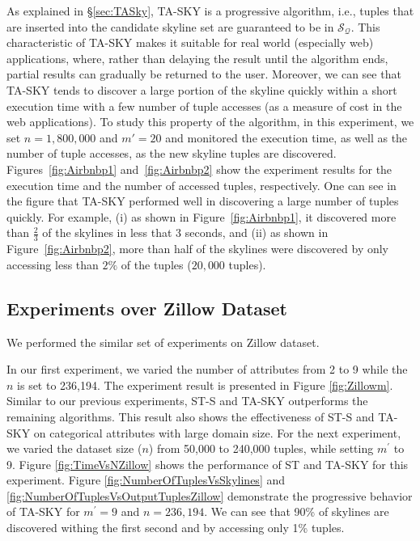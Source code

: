 \vspace{1mm}
As explained in \S\ref{sec:TASky}, TA-SKY is a progressive algorithm, i.e., tuples that are inserted into the candidate skyline set are guaranteed to be in $\mathcal{S}_\mathcal{Q}$.
This characteristic of TA-SKY makes it suitable for real world (especially web) applications, where, rather than delaying the result until the algorithm ends, partial results can gradually be returned to the user. Moreover, we can see that TA-SKY tends to discover a large portion of the skyline quickly within a short execution time with a few number of tuple accesses (as a measure of cost in the web applications).
To study this property of the algorithm, in this experiment, we set $n=1,800,000$ and $m'=20$ and monitored the execution time, as well as the number of tuple accesses, as the new skyline tuples are discovered. 
Figures~\ref{fig:Airbnbp1} and~\ref{fig:Airbnbp2} show the experiment results for the execution time and the number of accessed tuples, respectively.
One can see in the figure that TA-SKY performed well in discovering a large number of tuples quickly. For example, (i) as shown in Figure~\ref{fig:Airbnbp1}, it discovered more than $\frac{2}{3}$ of the skylines in less that $3$ seconds, and (ii) as shown in Figure~\ref{fig:Airbnbp2}, more than half of the skylines were discovered by only accessing less than $2\%$ of the tuples ($20,000$ tuples).



\subsection{Experiments over Zillow Dataset}\label{subsec:expZillow}

We performed the similar set of experiments on Zillow dataset.

\vspace{1mm}
In our first experiment, we varied the number of attributes from 2 to 9 while the $n$ is set to 236,194. The experiment result is presented in Figure \ref{fig:Zillowm}. Similar to our previous experiments, ST-S and TA-SKY outperforms the remaining algorithms. This result also shows the effectiveness of ST-S and TA-SKY on categorical attributes with large domain size. For the next experiment, we varied the dataset size ($n$) from 50,000 to 240,000 tuples, while setting $m^\prime$ to 9. Figure \ref{fig:TimeVsNZillow} shows the performance of ST and TA-SKY for this experiment. Figure \ref{fig:NumberOfTuplesVsSkylines} and \ref{fig:NumberOfTuplesVsOutputTuplesZillow} demonstrate the progressive behavior of TA-SKY for $m^\prime = 9$ and $n= 236,194$. We can see that 90\% of skylines are discovered withing the first second and by accessing only 1\% tuples.
 

